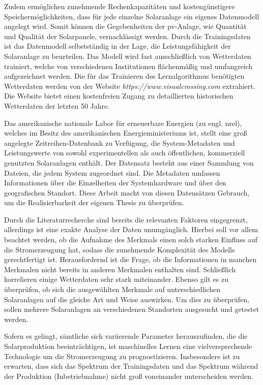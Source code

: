 \documentclass[12pt, a4paper]{article}
\begin{document}
Zudem ermöglichen zunehmende Rechenkapazitäten und kostengünstigere Speichermöglichkeiten, dass für jede einzelne Solaranlage ein eigenes Datenmodell angelegt wird. Somit können die Gegebenheiten der \ac{pv}-Anlage, wie Quantität und Qualität der Solarpanele, vernachlässigt werden. Durch die Trainingsdaten ist das Datenmodell selbstständig in der Lage, die Leistungsfähigkeit der Solaranlage zu beurteilen. Das Modell wird fast ausschließlich von Wetterdaten trainiert, welche von verschiedenen Institutionen flächenmäßig und umfangreich aufgezeichnet werden. Die für das Trainieren des Lernalgorithmus benötigten Wetterdaten werden von der Website \textit{https://www.visualcrossing.com} extrahiert. Die Website bietet einen kostenfreien Zugang zu detaillierten historischen Wetterdaten der letzten 50 Jahre.

Das amerikanische nationale Labor für erneuerbare Energien (zu engl. \ac{nrel}), welches im Besitz des amerikanischen Energieministeriums ist, stellt eine groß angelegte Zeitreihen-Datenbank zu Verfügung, die System-Metadaten und Leistungswerte von sowohl experimentellen als auch öffentlichen, kommerziell genutzten Solaranlagen enthält.  Der Datensatz besteht aus einer Sammlung von Dateien, die jedem System zugeordnet sind. Die Metadaten umfassen Informationen über die Einzelheiten der Systemhardware und über den geografischen Standort. Diese Arbeit macht von diesen Datensätzen Gebrauch, um die Realisierbarkeit der eigenen Thesis zu überprüfen. 

Durch die Literaturrecherche sind bereits die relevanten Faktoren eingegrenzt, allerdings ist eine exakte Analyse der Daten unumgänglich. Hierbei soll vor allem beachtet werden, ob die Aufnahme des Merkmals einen solch starken Einfluss auf die Stromerzeugung hat, sodass die zunehmende Komplexität des Modells gerechtfertigt ist. Herausfordernd ist die Frage, ob die Informationen in manchen Merkmalen nicht bereits in anderen Merkmalen enthalten sind. Schließlich korrelieren einige Wetterdaten sehr stark miteinander. Ebenso gilt es zu überprüfen, ob sich die ausgewählten Merkmale auf unterschiedlichen Solaranlagen auf die gleiche Art und Weise auswirken. Um dies zu überprüfen, sollen mehrere Solaranlagen an verschiedenen Standorten ausgesucht und getestet werden.

Sofern es gelingt, sämtliche sich variierende Parameter herauszufinden, die die Solarproduktion beeinträchtigen, ist maschinelles Lernen eine vielversprechende Technologie um die Stromerzeugung zu prognostizieren. Insbesondere ist zu erwarten, dass sich das Spektrum der Trainingsdaten und das Spektrum während der Produktion (Inbetriebnahme) nicht groß voneinander unterscheiden werden.
\end{document}
